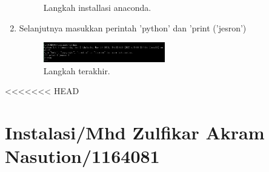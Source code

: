 \begin{enumerate}
\begin{figure}[ht]
\caption{Langkah installasi anaconda.}
\end{figure}
\item  Selanjutnya masukkan perintah 'python' dan 'print ('jesron')
\begin{figure}[ht]
\centerline{\includegraphics[width=0.5\textwidth]{figures/4.JPEG}}
\caption{Langkah terakhir.}
\end{figure}
\end{enumerate}

<<<<<<< HEAD
\section{Instalasi/Mhd Zulfikar Akram Nasution/1164081}
